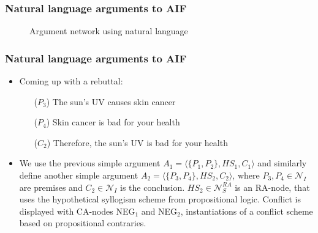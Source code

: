 \documentclass{beamer}
\begin{document}
\begin{frame}
\frametitle{Natural language arguments to AIF}
\begin{figure}
\caption{Argument network using natural language} \label{argnet}
\end{figure}
\end{frame}

\begin{frame}
\frametitle{Natural language arguments to AIF}
\begin{itemize}
\item Coming up with a rebuttal: \pause
  \begin{itemize}
  \item[($P_3$)] The sun's UV causes skin cancer \pause
  \item[($P_4$)] Skin cancer is bad for your health \pause
  \item[($C_2$)] Therefore, the sun's UV is bad for your health \pause
  \end{itemize}
\item We use the previous simple argument $A_1 = \langle \lbrace P_1, P_2 \rbrace, HS_1, C_1\rangle$ and similarly define another simple argument $A_2 = \langle \lbrace P_3, P_4 \rbrace, HS_2, C_2\rangle$, where $P_3, P_4 \in \mathcal{N}_I$ are premises and $C_2 \in \mathcal{N}_I$ is the conclusion. $HS_2 \in \mathcal{N}_S^{RA}$ is an RA-node, that uses the hypothetical syllogism scheme from propositional logic. Conflict is displayed with CA-nodes NEG$_1$ and NEG$_2$, instantiations of a conflict scheme based on propositional contraries.
\end{itemize}
\end{frame}
\end{document}
